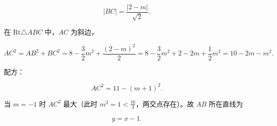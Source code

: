 \begin{answer}
\nopagebreak[4]
\[|BC|=\frac{|2-m|}{\sqrt2}.\]

在 $\mathrm{Rt}\triangle ABC$ 中，$AC$ 为斜边，

\nopagebreak[4]
\[AC^2=AB^2+BC^2=8-\frac32m^2+\frac{(2-m)^2}{2}
=8-\frac32m^2+2-2m+\frac12m^2
=10-2m-m^2 .\]

配方：

\nopagebreak[4]
\[AC^2=11-(m+1)^2 .\]

当 $m=-1$ 时 $AC^2$ 最大（此时 $m^2=1<\frac{16}{3}$，两交点存在）。故 $AB$ 所在直线为

\nopagebreak[4]
\[y=x-1 .\]


\end{answer}
